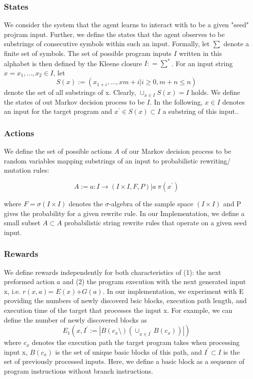 \subsubsection{States}
We consider the system that the agent learns to interact with to be a given "seed" projram input. Further, we define the states that the agent observes to be substrings of consecutive symbols within such an input. Formally, let $\sum$ denote a finite set of symbols. The set of possible program inputs $I$ written in this alphabet is then defined by the Kleene closure $I : = \sum^{*}$. For an input string $x = x_{1}, ..., x_{2} \in I$, let
$$S(x) := {(x_{1+i}, ..., x{m+i} | i\geq 0, m+n \leq n)}$$
denote the set of all substrings of x. Clearly, $\cup_{x\in I}S(x) = I$ holds. We define the states of out Markov decision process to be $I$. In the following, $x\in I$ denotes an input for the target program and $x^{'} \in S(x) \subset I$ a substring of this input..

\subsubsection{Actions}
We define the set of possible actions $A$ of our Markov decision process to be random variables mapping substrings of an input to probabilistic rewriting/ mutation rules:

$$A:={a:I \rightarrow (I \times I, F, P)|a~\pi(x^{'})}$$

where $F = \sigma (I \times I)$ denotes the $\sigma$-algebra of the sample space $(I \times I)$ and P gives the probability for a given rewrite rule. In our Implementation, we define a small subset $A \subset A$ probabilistic string rewrite rules that operate on a given seed input.

\subsubsection{Rewards}
We define rewards independently for both characteristics of (1): the next preformed action $a$ and (2) the program execution with the next generated input x, i.e. $r(x,a)$= $E(x)$+$G(a)$.
In our implementation, we experiment with E providing the numbers of newly discoverd bsic blocks, execution path length,  and execution time of the target that processes the input x. For example, we can define the number of newly discovered blocks as 
$$E_{1}(x, I^{'} := |B(c_{x} \setminus) (\cup_{x\in I^{'}}B(c_{x}))|)$$
where $c_{x}$ denotes the execution path the target program takes when processing input x, $B(c_{x})$ is the set of unique basic blocks of this path, and $I^{'} \subset I$ is the set of previously processed inputs. Here, we define a basic block as a sequence of program instructions without branch instructions.

